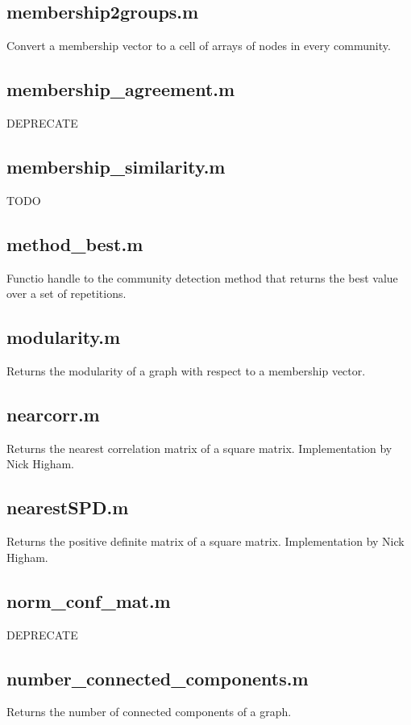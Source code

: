 \begin{itemize}[<+->]
  \subsection*{membership2groups.m} Convert a membership vector to a cell of
  arrays of nodes in every community.

  \subsection*{membership\_agreement.m} DEPRECATE

  \subsection*{membership\_similarity.m} TODO

  \subsection*{method\_best.m} Functio handle to the community detection
  method that returns the best value over a set of repetitions.

  \subsection*{modularity.m} Returns the modularity of a graph with respect
  to a membership vector.

  \subsection*{nearcorr.m} Returns the nearest correlation matrix of a square
  matrix. Implementation by Nick Higham.

  \subsection*{nearestSPD.m} Returns the positive definite matrix of a square
  matrix. Implementation by Nick Higham.

  \subsection*{norm\_conf\_mat.m} DEPRECATE

  \subsection*{number\_connected\_components.m} Returns the number of
  connected components of a graph.


\end{itemize}
